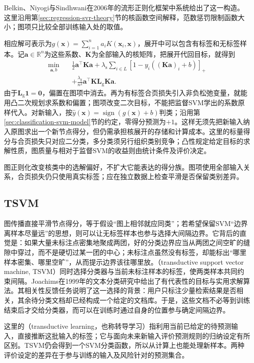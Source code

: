 Belkin、Niyogi与Sindhwani在2006年的流形正则化框架中系统给出了这一构造。这里沿用第\ref{sec:regression-svr-theory}节的核函数空间解释，范数惩罚限制函数大小；图项只比较全部训练输入处的取值。

相应解可表示为$g(\bm{x})=\sum_{i=1}^{n}a_iK(\bm{x}_i,\bm{x})$，展开中可以包含有标签和无标签样本。记$\bm a\in\mathbb R^n$为这些系数、$\bm K$为全部输入的核矩阵，把展开代回目标，就得到
\[
 \begin{aligned}
  \min_{\bm a,b}\quad&\frac12\bm a^\top\bm K\bm a
    +\lambda_{\mathrm s}\sum_{i\in L}[1-y_i((\bm K\bm a)_i+b)]_+\\
    &+\frac{\lambda_{\mathrm g}}{n^2}\bm a^\top\bm K\bm L_{\mathrm g}\bm K\bm a.
 \end{aligned}
\]
由于$\bm L_{\mathrm g}\bm1=\bm0$，偏置在图项中消去。再为有标签合页损失引入非负松弛变量，就能用凸二次规划求系数和偏置；图项改变二次目标，不能把监督SVM学出的系数原样代入。对新输入，按$\hat y(\bm{x})=\operatorname{sign}(g(\bm{x})+b)$判类；沿用第\ref{sec:classification-svm-model}节的约定，零得分预测为$+1$。这样无须先把新输入纳入原图求出一个新节点得分，但仍需承担核展开的存储和计算成本。这里的标量得分与合页损失只对应二分类，多分类须另行组织类别竞争；凸性规定给定目标的求解性质，图质量与相对于监督SVM的收益则由统计条件及评价决定。

图正则化改变核类中的选解偏好，不扩大它能表达的得分族。图项使用全部输入关系，合页损失仍只使用真实标签；应在独立数据上检查平滑是否保留类别差异。

\subsection{TSVM}
\label{sec:classification-tsvm}

图传播直接平滑节点得分，等于假设“图上相邻就应同类”；若希望保留SVM“边界离样本尽量远”的思想，则可以让无标签样本也参与选择大间隔边界。它背后的直觉是：如果大量未标注点密集地聚成两团，好的分类边界应当从两团之间空旷的缝隙中穿过，而不是硬切过某一团的中心；未标注点虽然没有标签，却能标出“哪里样本密集、哪里空旷”，从而提示边界该往哪里放。（transductive support vector machine, TSVM）同时选择分类器与当前未标注样本的标签，使两类样本共同约束间隔。Joachims在1999年的文本分类研究中给出了有代表性的目标与实用求解算法。其相关性反馈任务说明了这一选择的背景：用户只标注少量检索结果是否相关，其余待分类文档却已经构成一个给定的文档库。于是，这些文档不必等到训练结束后才交给分类器，而可以在训练时通过自身的位置参与确定间隔边界。

这里的（transductive learning，也称转导学习）指利用当前已给定的待预测输入，直接推断这批输入的标签；它与面向未来新输入评价预测规则的归纳设定有所区别。TSVM仍会得到一个SVM分类函数，所以从计算上也能处理新样本。两种评价设定的差异在于参与训练的输入及风险针对的预测集合。

